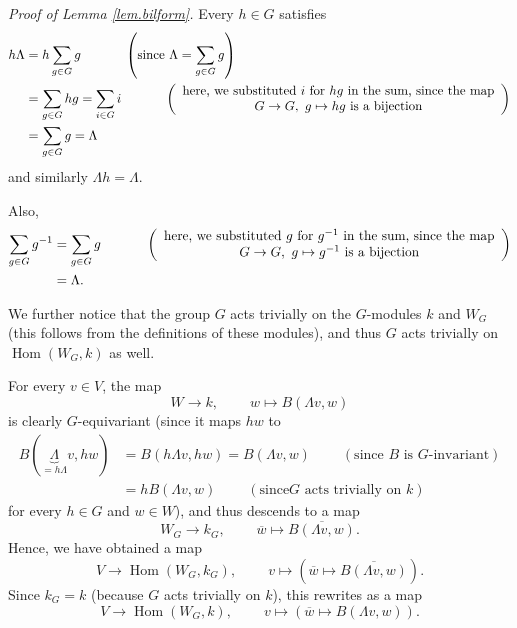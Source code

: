 \documentclass
[numbers=enddot,12pt,final,onecolumn,german,notitlepage]{scrartcl}%
\theoremstyle{definition}
\begin{document}
\textit{Proof of Lemma \ref{lem.bilform}.} Every $h\in G$ satisfies%
\begin{align*}
h\Lambda &  =h\sum\limits_{g\in G}g\ \ \ \ \ \ \ \ \ \ \left(  \text{since
}\Lambda=\sum\limits_{g\in G}g\right) \\
&  =\sum\limits_{g\in G}hg=\sum\limits_{i\in G}i\ \ \ \ \ \ \ \ \ \ \left(
\begin{array}
[c]{c}%
\text{here, we substituted }i\text{ for }hg\text{ in the sum, since the map}\\
G\rightarrow G,\ g\mapsto hg\text{ is a bijection}%
\end{array}
\right) \\
&  =\sum\limits_{g\in G}g=\Lambda
\end{align*}
and similarly $\Lambda h=\Lambda$.

Also,%
\begin{align*}
\sum\limits_{g\in G}g^{-1}  &  =\sum\limits_{g\in G}%
g\ \ \ \ \ \ \ \ \ \ \left(
\begin{array}
[c]{c}%
\text{here, we substituted }g\text{ for }g^{-1}\text{ in the sum, since the
map}\\
G\rightarrow G,\ g\mapsto g^{-1}\text{ is a bijection}%
\end{array}
\right) \\
&  =\Lambda.
\end{align*}


We further notice that the group $G$ acts trivially on the $G$-modules $k$ and
$W_{G}$ (this follows from the definitions of these modules), and thus $G$
acts trivially on $\operatorname*{Hom}\left(  W_{G},k\right)  $ as well.

For every $v\in V$, the map%
\[
W\rightarrow k,\ \ \ \ \ \ \ \ \ \ w\mapsto B\left(  \Lambda v,w\right)
\]
is clearly $G$-equivariant (since it maps $hw$ to%
\begin{align*}
B\left(  \underbrace{\Lambda}_{=h\Lambda}v,hw\right)   &  =B\left(  h\Lambda
v,hw\right)  =B\left(  \Lambda v,w\right)  \ \ \ \ \ \ \ \ \ \ \left(
\text{since }B\text{ is }G\text{-invariant}\right) \\
&  =hB\left(  \Lambda v,w\right)  \ \ \ \ \ \ \ \ \ \ \left(  \text{since
}G\text{ acts trivially on }k\right)
\end{align*}
for every $h\in G$ and $w\in W$), and thus descends to a map%
\[
W_{G}\rightarrow k_{G},\ \ \ \ \ \ \ \ \ \ \overline{w}\mapsto\overline
{B\left(  \Lambda v,w\right)  }.
\]
Hence, we have obtained a map%
\[
V\rightarrow\operatorname*{Hom}\left(  W_{G},k_{G}\right)
,\ \ \ \ \ \ \ \ \ \ v\mapsto\left(  \overline{w}\mapsto\overline{B\left(
\Lambda v,w\right)  }\right)  .
\]
Since $k_{G}=k$ (because $G$ acts trivially on $k$), this rewrites as a map%
\[
V\rightarrow\operatorname*{Hom}\left(  W_{G},k\right)
,\ \ \ \ \ \ \ \ \ \ v\mapsto\left(  \overline{w}\mapsto B\left(  \Lambda
v,w\right)  \right)  .
\]
\end{document}
